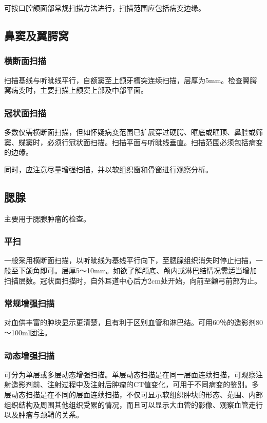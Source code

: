 可按口腔颌面部常规扫描方法进行，扫描范围应包括病变边缘。

\subsection{鼻窦及翼腭窝}

\subsubsection{横断面扫描}

扫描基线与听眦线平行，自额窦至上颌牙槽突连续扫描，层厚为5mm。检查翼腭窝病变时，主要扫描上颌窦上部及中部平面。

\subsubsection{冠状面扫描}

多数仅需横断面扫描，但如怀疑病变范围已扩展穿过硬腭、眶底或眶顶、鼻腔或筛窦、蝶窦时，必须行冠状面扫描。扫描平面与听眦线垂直。扫描范围必须包括病变的边缘。

同时，应注意尽量增强扫描，并以软组织窗和骨窗进行观察分析。

\subsection{腮腺}

主要用于腮腺肿瘤的检查。

\subsubsection{平扫}

一般采用横断面扫描，以听眦线为基线平行向下，至腮腺组织消失时停止扫描，一般至下颌角即可。层厚5～10mm。如欲了解颅底、颅内或淋巴结情况需适当增加扫描层数。冠状面扫描时，自外耳道中心后方2cm处开始，向前至颧弓前部为止。

\subsubsection{常规增强扫描}

对血供丰富的肿块显示更清楚，且有利于区别血管和淋巴结。可用60％的造影剂80～100ml团注。

\subsubsection{动态增强扫描}

可分为单层或多层动态增强扫描。单层动态扫描是在同一层面连续扫描，可观察注射造影剂前、注射过程中及注射后肿瘤的CT值变化，可用于不同病变的鉴别。多层动态扫描是在不同的层面连续扫描，不仅可显示软组织肿块的形态、范围、内部组织结构及周围其他组织受累的情况，而且可以显示大血管的影像、观察血管走行以及肿瘤与颈鞘的关系。

